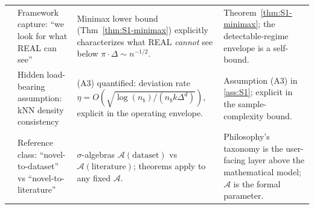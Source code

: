 \begin{table}[h]
\begin{tabular}{p{0.6cm} p{3.6cm} p{4.7cm} p{4.0cm}}
\addlinespace[2pt]
6 & Framework capture: ``we look for what REAL can see'' & Minimax lower bound (Thm~\ref{thm:S1-minimax}) explicitly characterizes what REAL \emph{cannot} see below $\pi \cdot \Delta \sim n^{-1/2}$. & Theorem~\ref{thm:S1-minimax}; the detectable-regime envelope is a self-bound. \\
\addlinespace[2pt]
7 & Hidden load-bearing assumption: kNN density consistency & (A3) quantified: deviation rate $\eta = O(\sqrt{\log(n_b)/(n_b k \Delta^d)})$, explicit in the operating envelope. & Assumption (A3) in \ref{ass:S1}; explicit in the sample-complexity bound. \\
\addlinespace[2pt]
8 & Reference class: ``novel-to-dataset'' vs ``novel-to-literature'' & $\sigma$-algebras $\mathcal{A}(\text{dataset})$ vs $\mathcal{A}(\text{literature})$; theorems apply to any fixed $\mathcal{A}$. & Philosophy's taxonomy is the user-facing layer above the mathematical model; $\mathcal{A}$ is the formal parameter. \\
\bottomrule
\end{tabular}
\end{table}
